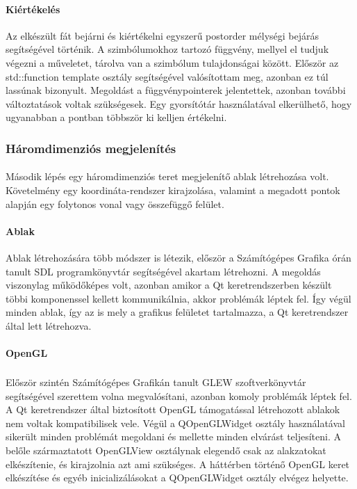 \documentclass[12pt]{report}
\begin{document}
\paragraph{Kiértékelés}
Az elkészült fát bejárni és kiértékelni egyszerű postorder mélységi bejárás segítségével történik. A szimbólumokhoz tartozó függvény, mellyel el tudjuk végezni a műveletet, tárolva van a szimbólum tulajdonságai között. Először az std::function template osztály segítségével valósítottam meg, azonban ez túl lassúnak bizonyult. Megoldást a függvénypointerek jelentettek, azonban további változtatások voltak szükségesek. Egy gyorsítótár használatával elkerülhető, hogy ugyanabban a pontban többször ki kelljen értékelni.

\subsubsection{Háromdimenziós megjelenítés}
\paragraph{}
Második lépés egy háromdimenziós teret megjelenítő ablak létrehozása volt. Követelmény egy koordináta-rendszer kirajzolása, valamint a megadott pontok alapján egy folytonos vonal vagy összefüggő felület.

\paragraph{Ablak}
Ablak létrehozására több módszer is létezik, először a Számítógépes Grafika órán tanult SDL programkönyvtár segítségével akartam létrehozni. A megoldás viszonylag működőképes volt, azonban amikor a Qt keretrendszerben készült többi komponenssel kellett kommunikálnia, akkor problémák léptek fel. Így végül minden ablak, így az is mely a grafikus felületet tartalmazza, a Qt keretrendszer által lett létrehozva.

\paragraph{OpenGL}
Először szintén Számítógépes Grafikán tanult GLEW\textsuperscript{\cite{glew}} szoftverkönyvtár segítségével szerettem volna megvalósítani, azonban komoly problémák léptek fel. A Qt keretrendszer által biztosított OpenGL támogatással létrehozott ablakok nem voltak kompatibilisek vele. Végül a QOpenGLWidget osztály használatával sikerült minden problémát megoldani és mellette minden elvárást teljesíteni. A belőle származtatott OpenGLView osztálynak elegendő csak az alakzatokat elkészítenie, és kirajzolnia azt ami szükséges. A háttérben történő OpenGL keret elkészítése és egyéb inicializálásokat a QOpenGLWidget osztály elvégez helyette.
\end{document}
